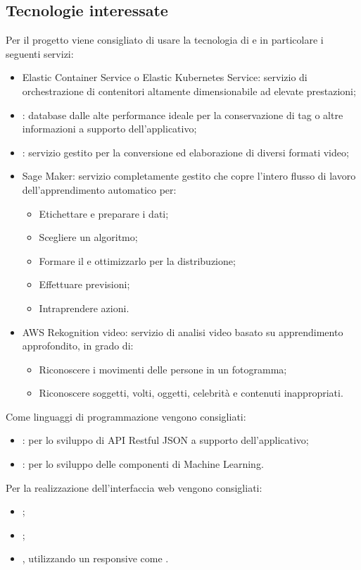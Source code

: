\documentclass[../studio-di-fattibilita.tex]{subfiles}
\begin{document}
\subsection{Tecnologie interessate}%
\label{sub:tecnologie_interessate}
Per il progetto viene consigliato di usare la tecnologia di  e in particolare i seguenti servizi:
\begin{itemize}
  \item Elastic  Container  Service  o  Elastic  Kubernetes  Service: servizio  di  orchestrazione  di  contenitori  altamente  dimensionabile  ad  elevate prestazioni;
  \item {}: database  dalle alte performance ideale per la conservazione di tag o altre informazioni a supporto dell'applicativo;
  \item {}: servizio gestito per la conversione ed elaborazione di diversi formati video;
  \item Sage Maker: servizio completamente gestito che copre l'intero flusso di lavoro dell'apprendimento automatico per:
  \begin{itemize}
    \item Etichettare e preparare i dati;
    \item Scegliere un algoritmo;
    \item Formare il  e ottimizzarlo per la distribuzione;
    \item Effettuare previsioni;
    \item Intraprendere azioni.
  \end{itemize} 
  \item AWS Rekognition video: servizio di analisi video basato su apprendimento approfondito, in grado di:
  \begin{itemize}
    \item Riconoscere i movimenti delle persone in un fotogramma;
    \item Riconoscere soggetti, volti, oggetti, celebrità e contenuti inappropriati.
  \end{itemize} 
\end{itemize}
Come linguaggi di programmazione vengono consigliati:
\begin{itemize}
    \item {}: per lo sviluppo di API Restful JSON a supporto dell’applicativo;
    \item {}: per lo sviluppo delle componenti di Machine Learning.
\end{itemize}
Per la realizzazione dell'interfaccia web vengono consigliati:
\begin{itemize}
  \item {};
  \item {};
  \item {}, utilizzando un  responsive come .
\end{itemize}
\end{document}
